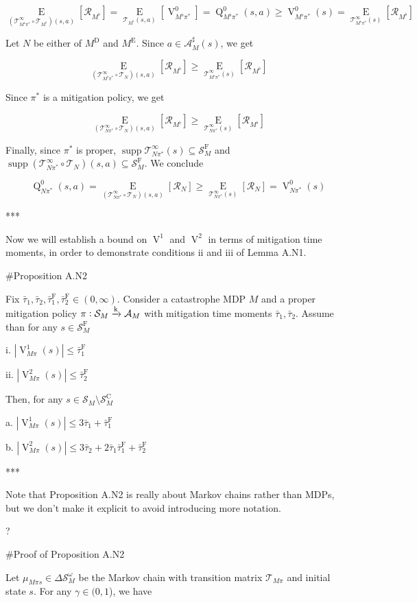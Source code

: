 \documentclass[a4paper]{article}
\DeclareMathOperator{\Supp}{supp}
\newcommand{\AP}[1]{\left(#1\right)}
\newcommand{\AB}[1]{\left[#1\right]}
\newcommand{\Ea}[2]{\underset{#1}{\operatorname{E}}\AB{#2}}
\newcommand{\Abs}[1]{\left\vert #1 \right\vert}
\newcommand{\M}{\xrightarrow{\textnormal{k}}}
\newcommand{\A}{\mathcal{A}}
\newcommand{\St}{\mathcal{S}}
\newcommand{\T}{\mathcal{T}}
\newcommand{\R}{\mathcal{R}}
\newcommand{\RMC}{\mathrm{C}}
\newcommand{\RMD}{\mathrm{D}}
\newcommand{\RME}{\mathrm{E}}
\newcommand{\RMF}{\mathrm{F}}
\newcommand{\SF}{\St^{\RMF}}
\newcommand{\SC}{\St^{\RMC}}
\newcommand{\MD}{M^{\RMD}}
\newcommand{\ME}{M^{\RME}}
\newcommand{\TF}{\bar{\tau}^{\RMF}}
\newcommand{\V}{\operatorname{V}}
\newcommand{\Q}{\operatorname{Q}}
\begin{document}
$$\Ea{\AP{\T_{M^\flat\pi^*}^\infty \circ \T_{M^\flat}}(s,a)}{\R_{M^\flat}} = \Ea{\T_{M^\flat}(s,a)}{\V^0_{M^\flat\pi^*}} = \Q_{M^\flat\pi^*}^0(s,a) \geq \V_{M^\flat\pi^*}^0(s) = \Ea{\T_{M^\flat\pi^*}^\infty(s)}{\R_{M^\flat}}$$

Let $N$ be either of $\MD$ and $\ME$. Since $a \in \A_M^\sharp(s)$, we get

$$\Ea{\AP{\T_{M^\flat\pi^*}^\infty \circ \T_{N}}(s,a)}{\R_{M^\flat}} \geq \Ea{\T_{M^\flat\pi^*}^\infty(s)}{\R_{M^\flat}}$$

Since $\pi^*$ is a mitigation policy, we get

$$\Ea{\AP{\T_{N\pi^*}^\infty \circ \T_{N}}(s,a)}{\R_{M^\flat}} \geq \Ea{\T_{N\pi^*}^\infty(s)}{\R_{M^\flat}}$$

Finally, since $\pi^*$ is proper, $\Supp{\T_{N\pi^*}^\infty(s)} \subseteq \SF_M$ and $\Supp{\AP{\T_{N\pi^*}^\infty \circ \T_{N}}(s,a)} \subseteq \SF_M$. We conclude

$$\Q_{N\pi^*}^0(s,a) = \Ea{\AP{\T_{N\pi^*}^\infty \circ \T_{N}}(s,a)}{\R_{N}} \geq \Ea{\T_{N\pi^*}^\infty(s)}{\R_{N}} = \V_{N\pi^*}^0(s)$$

***

Now we will establish a bound on $\V^1$ and $\V^2$ in terms of mitigation time moments, in order to demonstrate conditions ii and iii of Lemma A.N1.

\#Proposition A.N2

Fix $\bar{\tau}_1, \bar{\tau}_2, \TF_1, \TF_2 \in (0,\infty)$. Consider a catastrophe MDP $M$ and a proper mitigation policy $\pi: \St_M \M \A_M$ with mitigation time moments $\bar{\tau}_1, \bar{\tau}_2$. Assume than for any $s \in \SF_M$

i. $\Abs{\V^1_{M\pi}(s)} \leq \TF_1$

ii. $\Abs{\V^2_{M\pi}(s)} \leq \TF_2$

Then, for any $s \in \St_M \setminus \SC_M$

a. $\Abs{\V^1_{M\pi}(s)} \leq 3 \bar{\tau}_1 + \TF_1$

b. $\Abs{\V^2_{M\pi}(s)} \leq 3 \bar{\tau}_2 + 2 \bar{\tau}_1 \TF_1 + \TF_2$

***

Note that Proposition A.N2 is really about Markov chains rather than MDPs, but we don't make it explicit to avoid introducing more notation.

? %

\#Proof of Proposition A.N2

Let $\mu_{M\pi s}\in\Delta\St_M^\omega$ be the Markov chain with transition matrix $\T_{M\pi}$ and initial state $s$. For any $\gamma\in(0,1$), we have
\end{document}
